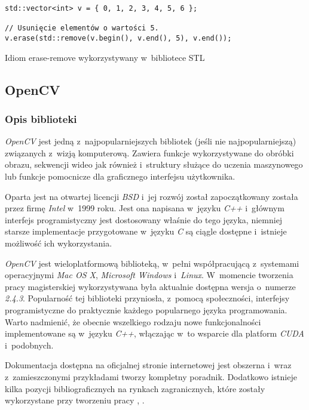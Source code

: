       \begin{sample}[ht]
        \begin{verbatim}
std::vector<int> v = { 0, 1, 2, 3, 4, 5, 6 };

// Usunięcie elementów o wartości 5.
v.erase(std::remove(v.begin(), v.end(), 5), v.end());
        \end{verbatim}
        \caption{Idiom erase-remove wykorzystywany w~bibliotece STL}
        \label{EraseRemoveIdiom}
      \end{sample}

    \subsection{OpenCV}\label{Subsection_OpenCV}

      \subsubsection{Opis biblioteki}
      \textit{OpenCV} jest jedną z~najpopularniejszych bibliotek (jeśli nie najpopularniejszą) związanych z~wizją komputerową. Zawiera funkcje wykorzystywane do obróbki obrazu, sekwencji wideo jak również i~struktury służące do uczenia maszynowego lub funkcje pomocnicze dla graficznego interfejsu użytkownika.

      Oparta jest na otwartej licencji \textit{BSD} i~jej rozwój został zapoczątkowany została przez firmę \textit{Intel} w~1999 roku. Jest ona napisana w~języku \textit{C++} i~głównym interfejs programistyczny jest dostosowany właśnie do tego języka, niemniej starsze implementacje przygotowane w~języku \textit{C} są ciągle dostępne i~istnieje możliwość ich wykorzystania.

      \textit{OpenCV} jest wieloplatformową biblioteką, w~pełni współpracującą z~systemami operacyjnymi \textit{Mac OS X}, \textit{Microsoft Windows} i~\textit{Linux}. W~momencie tworzenia pracy magisterskiej wykorzystywana była aktualnie dostępna wersja o~numerze \textit{2.4.3}. Popularność tej biblioteki przyniosła, z~pomocą społeczności, interfejsy programistyczne do praktycznie każdego popularnego języka programowania. Warto nadmienić, że obecnie wszelkiego rodzaju nowe funkcjonalności implementowane są w~języku \textit{C++}, włączając w~to wsparcie dla platform \textit{CUDA} i~podobnych.

      Dokumentacja dostępna na oficjalnej stronie internetowej jest obszerna i~wraz z~zamieszczonymi przykładami tworzy kompletny poradnik. Dodatkowo istnieje kilka pozycji bibliograficznych na rynkach zagranicznych, które zostały wykorzystane przy tworzeniu pracy \cite{LearningOpenCV}, \cite{OpenCVCookbook}.

